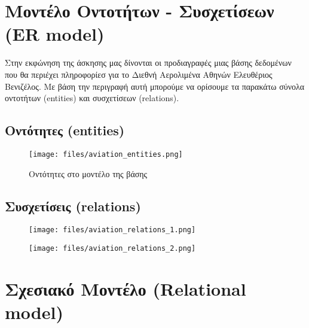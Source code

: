 \documentclass[11pt,a4paper]{article}
\begin{document}

\section{Μοντέλο Οντοτήτων - Συσχετίσεων (ER model)}
Στην εκφώνηση της άσκησης μας δίνονται οι προδιαγραφές μιας βάσης δεδομένων που θα περιέχει
πληροφορίεσ για το Διεθνή Αερολιμένα Αθηνών Ελευθέριος Βενιζέλος. Με βάση την
περιγραφή αυτή μπορούμε να ορίσουμε τα παρακάτω σύνολα οντοτήτων (entities)
και συσχετίσεων (relations).

\subsection{Οντότητες (entities)}
\begin{figure}[h]
\centering
\texttt{[image: files/aviation\_entities.png]}\\
\caption{Οντότητες στο μοντέλο της βάσης}
\end{figure}

\subsection{Συσχετίσεις (relations)}
\begin{figure}[h]
\centering
\texttt{[image: files/aviation\_relations\_1.png]}\\
\end{figure}

\begin{figure}[h]
\centering
\texttt{[image: files/aviation\_relations\_2.png]}\\
\end{figure}

\section{Σχεσιακό Μοντέλο  (Relational model)}
\end{document}
